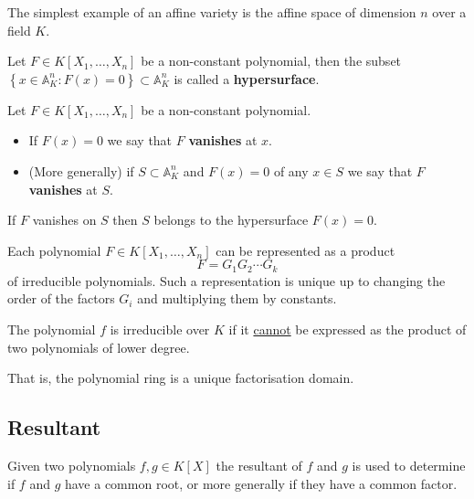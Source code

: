 \documentclass[12pt, a4paper]{article}
\renewcommand{\AA}{\mathbb A}
\begin{document}
\begin{mdexample}
    The simplest example of an affine variety is the affine space of dimension \(n\) over a field \(K\).
\end{mdexample}

\begin{definition}
    Let \(F \in K[X_1,\ldots,X_n]\) be a non-constant polynomial, then the subset \(\left\{ x \in \AA^n_K : F(x)=0 \right\} \subset \AA^n_K\) is called a \textbf{hypersurface}. 
\end{definition}

\begin{definition}
    Let \(F \in K[X_1,\ldots,X_n]\) be a non-constant polynomial.
    \begin{itemize}
        \item If \(F(x)=0\) we say that \(F\) \textbf{vanishes} at \(x\).
        \item (More generally) if \(S \subset \AA^n_K\) and \(F(x)=0\) of any \(x\in S\) we say that \(F\) \textbf{vanishes} at \(S\). 
    \end{itemize}
\end{definition}

\begin{corollary}
    If \(F\) vanishes on \(S\) then \(S\) belongs to the hypersurface \(F(x)=0\). 
\end{corollary}

\begin{mdthm}
    Each polynomial \(F\in K[X_1,\ldots,X_n]\) can be represented as a product 
    \[F= G_1G_2 \cdots G_k\]
    of irreducible polynomials. Such a representation is unique up to changing the order of the factors \(G_i\) and multiplying them by constants.
\end{mdthm}

\begin{mdnote}
    The polynomial \(f\) is irreducible over \(K\) if it \ul{cannot} be expressed as the product of two polynomials of lower degree.
\end{mdnote}

\begin{mdremark}
    That is, the polynomial ring is a unique factorisation domain.
\end{mdremark}

\subsection{Resultant}

\begin{mdnote}
    Given two polynomials \(f,g \in K[X]\) the resultant of \(f\) and \(g\) is used to determine if \(f\) and \(g\) have a common root, or more generally if they have a common factor.
\end{mdnote}
\end{document}
